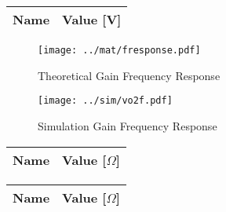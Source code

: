 \begin{center}
  \begin{tabular}{ | c | c | }
    \hline    
    {\bf Name} & {\bf Value [V]} \\ \hline
    
  \end{tabular}
\end{center}

\begin{figure}[H]
      \texttt{[image: ../mat/fresponse.pdf]}
      \caption{Theoretical Gain Frequency Response}
    \endminipage\hfill
      \texttt{[image: ../sim/vo2f.pdf]}
      \caption{Simulation Gain Frequency Response}
    \endminipage\hfill
\end{figure}

\begin{center}
  \begin{tabular}{ | c | c | }
    \hline    
    {\bf Name} & {\bf Value [$\Omega$]} \\ \hline
    
    \hline
  \end{tabular}
\end{center}

\begin{center}
  \begin{tabular}{ | c | c | }
    \hline    
    {\bf Name} & {\bf Value [$\Omega$]} \\ \hline
    
  \end{tabular}
\end{center}




